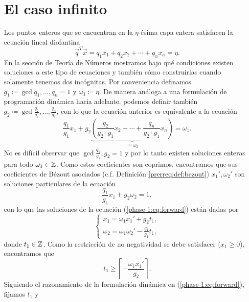 \chapter{El caso infinito}
\noindent
Los puntos enteros que se encuentran en la $\eta$-ésima capa entera satisfacen la ecuación lineal
diofantina
\begin{equation}
	\label{phase-1:eq:dioph}
	\vec{q}^T\vec{x} = q_1x_1 + q_2x_2 + \cdots + q_nx_n = \eta.
\end{equation}
En la sección de Teoría de Números mostramos bajo qué condiciones existen soluciones a este tipo de
ecuaciones y también cómo construirlas cuando solamente tenemos dos incógnitas. Por conveniencia
definamos $g_1 \coloneq \gcd{q_1, \ldots, q_n} = 1$ y $\omega_1 \coloneq \eta$. De manera análoga a
una formulación de programación dinámica hacia adelante, podemos definir también
$g_2 \coloneq \gcd{\frac{q_2}{g_1}, \ldots, \frac{q_n}{g_1}}$, con lo que la ecuación anterior es
equivalente a la ecuación
\begin{equation}
	\label{phase-1:eq:forward}
	\frac{q_1}{g_1}x_1 + g_2
		\underbrace{
		\left(\frac{q_2}{g_2 \cdot g_1}x_2 + \cdots + \frac{q_n}{g_2 \cdot g_1}x_n\right)}_{\coloneq
		\omega_2}
	= \omega_1.
\end{equation}
No es difícil observar que $\gcd{\frac{q_1}{g_1}, g_2} = 1$ y por lo tanto existen soluciones
enteras para todo $\omega_1 \in \mathbb{Z}$. Como estos coeficientes son coprimos, encontramos que sus
coeficientes de Bézout asociados (c.f. Definición \ref{prerreq:def:bezout}) $x_1', \omega_2'$ son
soluciones particulares de la ecuación
\begin{equation*}
	\frac{q_1}{g_1}x_1 + g_2\omega_2 = 1,
\end{equation*}
con lo que las soluciones de la ecuación (\ref{phase-1:eq:forward}) están dadas por
\begin{equation*}
	\begin{cases}
		x_1 = \omega_1x_1' + g_2t_1, \\
		\omega_2 = \omega_1\omega_2' - \frac{q_1}{g_1}t_1,
	\end{cases}
\end{equation*}
donde $t_1 \in \mathbb{Z}$. Como la restricción de no negatividad se debe satisfacer ($x_1 \geq 0$),
encontramos que
\begin{equation*}
	t_1 \geq \left\lceil -\frac{\omega_1x_1'}{g_2} \right\rceil.
\end{equation*}
Siguiendo el razonamiento de la formulación dinámica en (\ref{phase-1:eq:forward}), fijamos $t_1$ y
